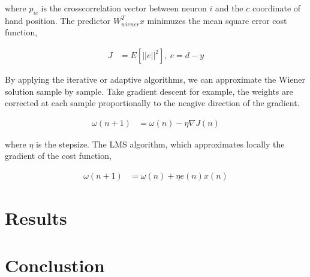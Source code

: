 \documentclass[8pt,a4paper]{article}
\begin{document}
\begin{multicols}{2}
where $p_{ic}$ is the crosscorrelation vector between neuron $i$ and the $c$ coordinate of hand position. 
The predictor $W_{wiener}^{T} x$ minimuzes the mean square error cost function, 

\begin{align}
  J&= E \left[   \lvert \lvert e   \rvert\rvert^{2}  \right], \ e=d-y
\end{align}

By applying the iterative or adaptive algorithms, we can approximate the Wiener solution sample by sample. 
Take gradient descent for example, the weights are corrected at each sample proportionally to the neagive direction of the gradient. 

\begin{align}
  \omega(n+1)&= \omega(n) -\eta  \nabla J(n)
\end{align}

where $ \eta $ is the stepsize. The LMS algorithm, which approximates locally the gradient of the cost function, 

\begin{align}
  \omega(n+1) &= \omega(n) + \eta e(n) x(n)
\end{align}



\section*{Results}


\section*{Conclustion}

 \label{sec:references}
\newpage


\end{multicols}
\end{document}
